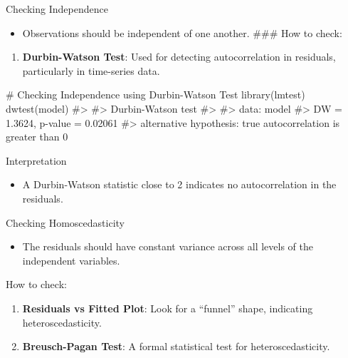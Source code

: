 \documentclass[
  18 pt,
  ignorenonframetext,
  aspectratio=1610,
]{beamer}
\newenvironment{Shaded}{\begin{snugshade}}{\end{snugshade}}
\newcommand{\CommentTok}[1]{\textcolor[rgb]{0.37,0.37,0.37}{#1}}
\newcommand{\FunctionTok}[1]{\textcolor[rgb]{0.28,0.35,0.67}{#1}}
\newcommand{\NormalTok}[1]{\textcolor[rgb]{0.00,0.23,0.31}{#1}}
\providecommand{\tightlist}{%
  \setlength{\itemsep}{0pt}\setlength{\parskip}{0pt}}\usepackage{longtable,booktabs,array}
\begin{document}
\begin{frame}[fragile]{Checking Independence}
\protect\hypertarget{checking-independence}{}
\begin{itemize}
\tightlist
\item
  Observations should be independent of one another. \tiny \#\#\# How to
  check:
\end{itemize}

\begin{enumerate}
\tightlist
\item
  \textbf{Durbin-Watson Test}: Used for detecting autocorrelation in
  residuals, particularly in time-series data.
\end{enumerate}

\begin{Shaded}
\begin{Highlighting}[]
\CommentTok{\# Checking Independence using Durbin{-}Watson Test}
\FunctionTok{library}\NormalTok{(lmtest)}
\FunctionTok{dwtest}\NormalTok{(model)}
\CommentTok{\#\textgreater{} }
\CommentTok{\#\textgreater{}  Durbin{-}Watson test}
\CommentTok{\#\textgreater{} }
\CommentTok{\#\textgreater{} data:  model}
\CommentTok{\#\textgreater{} DW = 1.3624, p{-}value = 0.02061}
\CommentTok{\#\textgreater{} alternative hypothesis: true autocorrelation is greater than 0}
\end{Highlighting}
\end{Shaded}

\begin{block}{Interpretation}
\protect\hypertarget{interpretation-4}{}
\begin{itemize}
\tightlist
\item
  A Durbin-Watson statistic close to 2 indicates no autocorrelation in
  the residuals.
\end{itemize}

\normalsize
\end{block}
\end{frame}

\begin{frame}{Checking Homoscedasticity}
\protect\hypertarget{checking-homoscedasticity}{}
\begin{itemize}
\tightlist
\item
  The residuals should have constant variance across all levels of the
  independent variables.
\end{itemize}

\begin{block}{How to check:}
\protect\hypertarget{how-to-check-1}{}
\begin{enumerate}
\tightlist
\item
  \textbf{Residuals vs Fitted Plot}: Look for a ``funnel'' shape,
  indicating heteroscedasticity.
\item
  \textbf{Breusch-Pagan Test}: A formal statistical test for
  heteroscedasticity.
\end{enumerate}
\end{block}
\end{frame}
\end{document}
